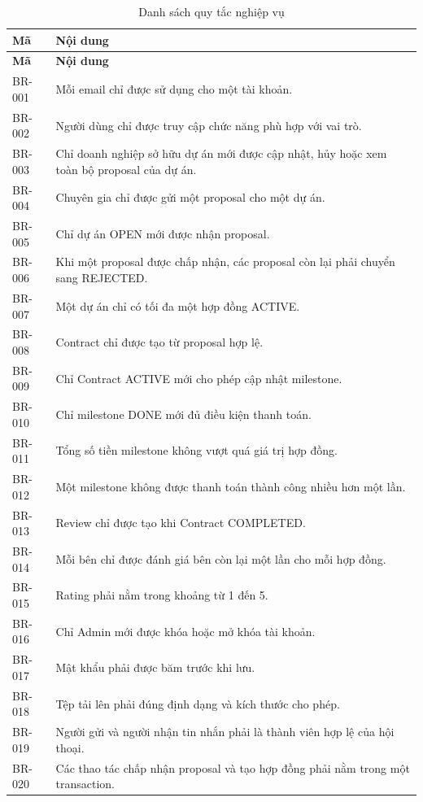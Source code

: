 \begin{longtable}{|p{2.0cm}|p{11.8cm}|}
\caption{Danh sách quy tắc nghiệp vụ}
\label{tab:business-rules} \\ \hline
\textbf{Mã} & \textbf{Nội dung} \\ \hline
\endfirsthead
\hline
\textbf{Mã} & \textbf{Nội dung} \\ \hline
\endhead

BR-001 & Mỗi email chỉ được sử dụng cho một tài khoản. \\ \hline
BR-002 & Người dùng chỉ được truy cập chức năng phù hợp với vai trò. \\ \hline
BR-003 & Chỉ doanh nghiệp sở hữu dự án mới được cập nhật, hủy hoặc xem toàn bộ proposal của dự án. \\ \hline
BR-004 & Chuyên gia chỉ được gửi một proposal cho một dự án. \\ \hline
BR-005 & Chỉ dự án OPEN mới được nhận proposal. \\ \hline
BR-006 & Khi một proposal được chấp nhận, các proposal còn lại phải chuyển sang REJECTED. \\ \hline
BR-007 & Một dự án chỉ có tối đa một hợp đồng ACTIVE. \\ \hline
BR-008 & Contract chỉ được tạo từ proposal hợp lệ. \\ \hline
BR-009 & Chỉ Contract ACTIVE mới cho phép cập nhật milestone. \\ \hline
BR-010 & Chỉ milestone DONE mới đủ điều kiện thanh toán. \\ \hline
BR-011 & Tổng số tiền milestone không vượt quá giá trị hợp đồng. \\ \hline
BR-012 & Một milestone không được thanh toán thành công nhiều hơn một lần. \\ \hline
BR-013 & Review chỉ được tạo khi Contract COMPLETED. \\ \hline
BR-014 & Mỗi bên chỉ được đánh giá bên còn lại một lần cho mỗi hợp đồng. \\ \hline
BR-015 & Rating phải nằm trong khoảng từ 1 đến 5. \\ \hline
BR-016 & Chỉ Admin mới được khóa hoặc mở khóa tài khoản. \\ \hline
BR-017 & Mật khẩu phải được băm trước khi lưu. \\ \hline
BR-018 & Tệp tải lên phải đúng định dạng và kích thước cho phép. \\ \hline
BR-019 & Người gửi và người nhận tin nhắn phải là thành viên hợp lệ của hội thoại. \\ \hline
BR-020 & Các thao tác chấp nhận proposal và tạo hợp đồng phải nằm trong một transaction. \\ \hline
\end{longtable}

